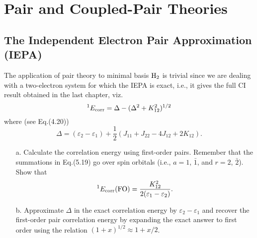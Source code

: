\documentclass[a4paper]{book}
\newcommand{\corr}{{\rm corr}}
\begin{document}

	\chapter{Pair and Coupled-Pair Theories}
	
	\section{The Independent Electron Pair Approximation (IEPA)}
	
	\begin{exercise}
	The application of pair theory  to minimal basis $\ce{H2}$ is trivial since we are dealing with a two-electron system for which the IEPA is exact, i.e., it gives the full CI result obtained in the last chapter, viz.
	\[
		{}^{1}E_{\corr} = \Delta - ( \Delta^2 + K^2_{12} )^{1/2}
	\]
	where (see Eq.(4.20))
	\[
		\Delta = (\varepsilon_2 - \varepsilon_1) + \frac{1}{2}( J_{11} + J_{22} - 4J_{12} + 2K_{12} ).
	\]
	\begin{enumerate}
	
	\item[a.] Calculate the correlation energy using first-order pairs. Remember that the summations in Eq.(5.19) go over spin orbitals (i.e., $a=1$, $\bar{1}$, and $r=2$, $\bar{2}$). Show that
	\[
		{}^{1} E_{\corr}({\rm FO}) = \frac{K^2_{12}}{ 2 ( \varepsilon_1 - \varepsilon_2) }.
	\]
	
	\item[b.] Approximate $\Delta$ in the exact correlation energy by $\varepsilon_2 - \varepsilon_1$ and recover the first-order pair correlation energy by expanding the exact answer to first order using the relation $(1+x)^{1/2} \approx 1 + x/2$.
	\end{enumerate}
	\end{exercise}
	
\end{document}

